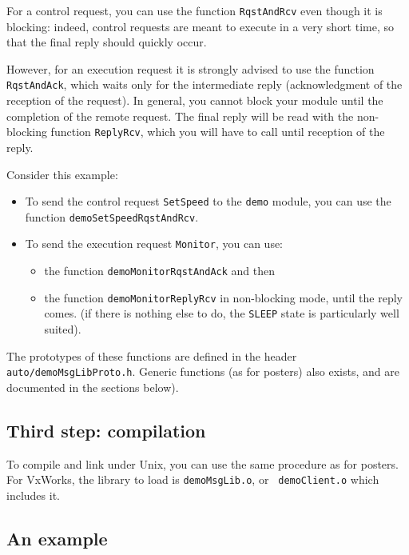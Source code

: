 For a  control request, you  can use  the function  {\tt RqstAndRcv} even
though it is blocking: indeed, control requests are meant to execute in a
very short time, so that the final reply should quickly occur.

However, for  an  execution request it   is strongly advised   to use the
function {\tt  RqstAndAck}, which waits only  for the  intermediate reply
(acknowledgment of the reception of the request).  In general, you cannot
block your module until the completion of the  remote request.  The final
reply will be  read with the  non-blocking function {\tt ReplyRcv}, which
you will have to call until reception of the reply.

Consider this example:

\begin{itemize}
\item To send the control request {\tt SetSpeed} to  the {\tt demo}
module, you can use the function {\tt demoSetSpeedRqstAndRcv}.

\item To send the execution request {\tt Monitor}, you can use:
   \begin{itemize}
      \item the function {\tt demoMonitorRqstAndAck} and then
      \item the function {\tt demoMonitorReplyRcv} in non-blocking mode,
until the reply comes. (if there is nothing else to do, the {\tt SLEEP}
state is particularly well suited).
   \end{itemize}
\end{itemize}

The prototypes  of  these  functions  are defined   in the  header   {\tt
auto/demoMsgLibProto.h}. Generic functions  (as for posters) also exists,
and are documented in the sections below).

\subsection{Third step: compilation}

To compile  and link under  Unix, you can use the  same procedure  as for
posters. For VxWorks, the library to load  is {\tt demoMsgLib.o}, or {\tt
demoClient.o} which includes it.


\subsection{An example}

